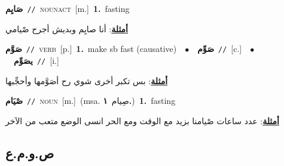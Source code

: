 \documentclass[10pt,a4paper,twoside]{article} %
\begin{document}
\begin{multicols}{2}
{\setlength\topsep{0pt}\textbf{\foreignlanguage{arabic}{صَايِم}}\ {\color{gray}\texttt{//}\color{black}}\ \textsc{noun\textunderscore act}\ [m.]\ \textbf{1.}~fasting\  \begin{flushright}\color{gray}\foreignlanguage{arabic}{\textbf{\underline{\foreignlanguage{arabic}{أمثلة}}}: أنا صايِم وبديش أجرح  صْيامي}\end{flushright}\color{black}} \vspace{2mm}

{\setlength\topsep{0pt}\textbf{\foreignlanguage{arabic}{صَوَّم}}\ {\color{gray}\texttt{//}\color{black}}\ \textsc{verb}\ [p.]\ \textbf{1.}~make sb fast (causative)\ \ $\bullet$\ \ \setlength\topsep{0pt}\textbf{\foreignlanguage{arabic}{صَوِّم}}\ {\color{gray}\texttt{//}\color{black}}\ [c.]\ \ $\bullet$\ \ \setlength\topsep{0pt}\textbf{\foreignlanguage{arabic}{يصَوِّم}}\ {\color{gray}\texttt{//}\color{black}}\ [i.]\  \begin{flushright}\color{gray}\foreignlanguage{arabic}{\textbf{\underline{\foreignlanguage{arabic}{أمثلة}}}: بس تكبر أخرى شوي رح أصَوَّمها وأحجِّبها}\end{flushright}\color{black}} \vspace{2mm}

{\setlength\topsep{0pt}\textbf{\foreignlanguage{arabic}{صْيَام}}\ {\color{gray}\texttt{//}\color{black}}\ \textsc{noun}\ [m.]\ \color{gray}(msa. \foreignlanguage{arabic}{صِيام}~\foreignlanguage{arabic}{\textbf{١.}})\color{black}\ \textbf{1.}~fasting\  \begin{flushright}\color{gray}\foreignlanguage{arabic}{\textbf{\underline{\foreignlanguage{arabic}{أمثلة}}}: عدد ساعات صْيامنا بزيد مع الوقت ومع الحر انسى الوضع متعب من الآخر}\end{flushright}\color{black}} \vspace{2mm}

\vspace{-3mm}
\subsection*{\color{blue}\foreignlanguage{arabic}{ص.و.م.ع}\color{blue}{}} 


\end{multicols}
\end{document}
